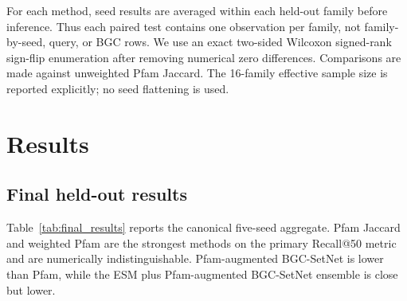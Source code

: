 \documentclass{article}
\begin{document}
For each method, seed results are averaged within each held-out family before inference. Thus each paired test contains one observation per family, not family-by-seed, query, or BGC rows. We use an exact two-sided Wilcoxon signed-rank sign-flip enumeration after removing numerical zero differences. Comparisons are made against unweighted Pfam Jaccard. The 16-family effective sample size is reported explicitly; no seed flattening is used.

\section{Results}

\subsection{Final held-out results}

Table~\ref{tab:final_results} reports the canonical five-seed aggregate. Pfam Jaccard and weighted Pfam are the strongest methods on the primary Recall@50 metric and are numerically indistinguishable. Pfam-augmented BGC-SetNet is lower than Pfam, while the ESM plus Pfam-augmented BGC-SetNet ensemble is close but lower.
\end{document}
